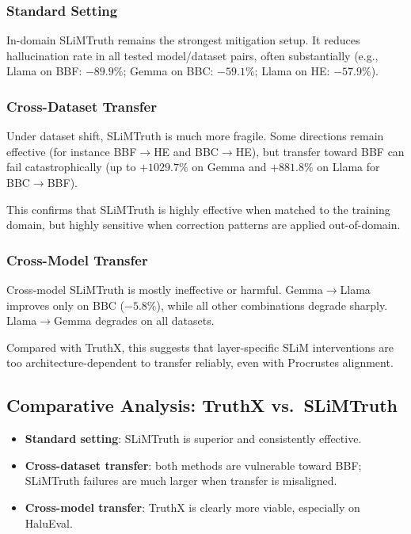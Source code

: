 \subsubsection{Standard Setting}
In-domain SLiMTruth remains the strongest mitigation setup. It reduces hallucination rate in all tested model/dataset pairs, often substantially (e.g., Llama on BBF: $-89.9\%$; Gemma on BBC: $-59.1\%$; Llama on HE: $-57.9\%$).

\subsubsection{Cross-Dataset Transfer}
Under dataset shift, SLiMTruth is much more fragile. Some directions remain effective (for instance BBF$\rightarrow$HE and BBC$\rightarrow$HE), but transfer toward BBF can fail catastrophically (up to $+1029.7\%$ on Gemma and $+881.8\%$ on Llama for BBC$\rightarrow$BBF).

This confirms that SLiMTruth is highly effective when matched to the training domain, but highly sensitive when correction patterns are applied out-of-domain.

\subsubsection{Cross-Model Transfer}
Cross-model SLiMTruth is mostly ineffective or harmful. Gemma$\rightarrow$Llama improves only on BBC ($-5.8\%$), while all other combinations degrade sharply. Llama$\rightarrow$Gemma degrades on all datasets.

Compared with TruthX, this suggests that layer-specific SLiM interventions are too architecture-dependent to transfer reliably, even with Procrustes alignment.

\subsection{Comparative Analysis: TruthX vs.\ SLiMTruth}
\begin{itemize}
    \item \textbf{Standard setting}: SLiMTruth is superior and consistently effective.
    \item \textbf{Cross-dataset transfer}: both methods are vulnerable toward BBF; SLiMTruth failures are much larger when transfer is misaligned.
    \item \textbf{Cross-model transfer}: TruthX is clearly more viable, especially on HaluEval.
\end{itemize}

